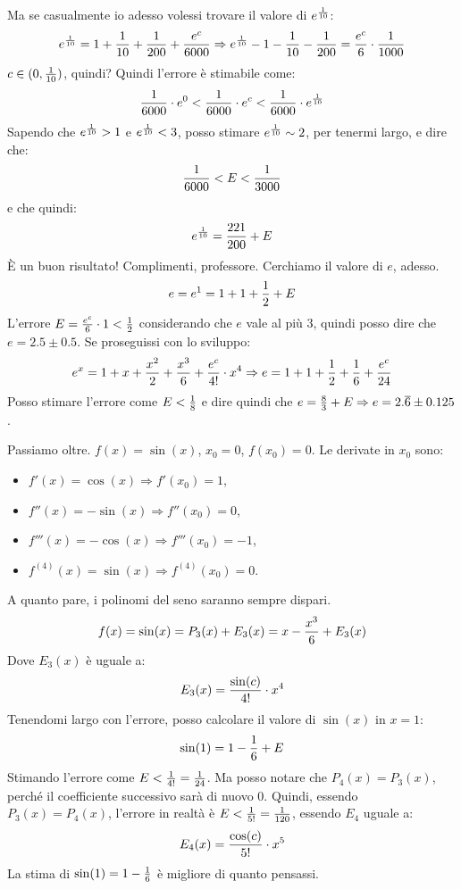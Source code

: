 \documentclass[12pt,a4paper]{article}
\begin{document}
Ma se casualmente io adesso volessi trovare il valore di $e^{1 \over 10}$:
$$
e^{1 \over 10} = 1 + {1 \over 10} + {1 \over 200} + {e^c \over 6000} 
\Rightarrow e^{1 \over 10} - 1 - {1 \over 10} - {1 \over 200} =
{e^c \over 6} \cdot {1 \over 1000}
$$
$c \in (0, {1 \over 10})$, quindi? Quindi l'errore \`e stimabile come:
$$
{1 \over 6000} \cdot e^0 < {1 \over 6000} \cdot e^c < 
{1 \over 6000} \cdot e^{1 \over 10}
$$
Sapendo che $e^{1 \over 10} > 1$ e $e^{1 \over 10} < 3$, posso stimare
$e^{1 \over 10} \sim 2$, per tenermi largo, e dire che:
$$
{1 \over 6000} < E < {1 \over 3000}
$$
e che quindi:
$$
e^{1 \over 10} = {221 \over 200} + E
$$
\`E un buon risultato! Complimenti, professore. Cerchiamo il valore di $e$,
adesso.
$$
e = e^1 = 1 + 1 + {1 \over 2} + E
$$
L'errore $E = {e^c \over 6} \cdot 1 < {1 \over 2}$ considerando che $e$ 
vale al pi\`u $3$, quindi posso dire che $e = 2.5 \pm 0.5$. 
Se proseguissi con lo sviluppo:
$$
e^x = 1 + x + {x^2 \over 2} + {x^3 \over 6} + {e^c \over 4!} \cdot x^4
\Rightarrow e = 1 + 1 + {1 \over 2} + {1 \over 6} + {e^c \over 24}
$$
Posso stimare l'errore come $E < {1 \over 8}$ e dire quindi che
$e = {8 \over 3} + E \Rightarrow e = 2.\overline{6} \pm 0.125$.

Passiamo oltre. $f(x) = \sin(x)$, $x_0 = 0$, $f(x_0) = 0$.
Le derivate in $x_0$ sono:
\begin{itemize}
\item $f'(x) = \cos(x) \Rightarrow f'(x_0) = 1$, 
\item $f''(x) = -\sin(x) \Rightarrow f''(x_0) = 0$, 
\item $f'''(x) = -\cos(x) \Rightarrow f'''(x_0) = -1$, 
\item $f^{(4)}(x) = \sin(x) \Rightarrow f^{(4)}(x_0) = 0$.
\end{itemize}
A quanto pare, i polinomi del seno saranno sempre dispari.
$$
f(x) = \sin(x) = P_3(x) + E_3(x) = x - {x^3 \over 6} + E_3(x)
$$
Dove $E_3(x)$ \`e uguale a:
$$
E_3(x) = {\sin(c) \over 4!} \cdot x^4
$$
Tenendomi largo con l'errore, posso calcolare il valore di $\sin(x)$ in $x=1$:
$$
\sin(1) = 1 - {1 \over 6} + E
$$
Stimando l'errore come $E < {1 \over 4!} = {1 \over 24}$. Ma posso notare 
che $P_4(x) = P_3(x)$, perch\'e il coefficiente successivo sar\`a di nuovo
$0$. Quindi, essendo $P_3(x) = P_4(x)$, l'errore in realt\`a \`e $E < 
{1 \over 5!} = {1 \over 120}$, essendo $E_4$ uguale a:
$$
E_4(x) = {\cos(c) \over 5!} \cdot x^5
$$
La stima di $\sin(1) = 1 - {1 \over 6}$ \`e migliore di quanto pensassi.
\end{document}
